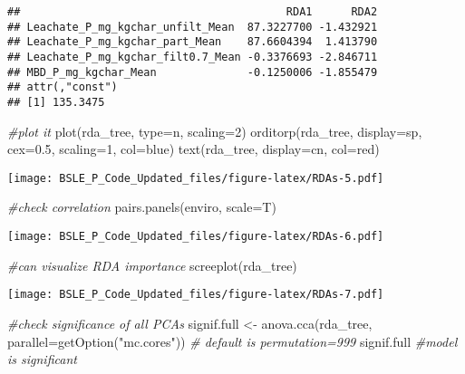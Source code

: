 \documentclass[
]{article}
\newenvironment{Shaded}{\begin{snugshade}}{\end{snugshade}}
\newcommand{\AttributeTok}[1]{\textcolor[rgb]{0.77,0.63,0.00}{#1}}
\newcommand{\CommentTok}[1]{\textcolor[rgb]{0.56,0.35,0.01}{\textit{#1}}}
\newcommand{\DecValTok}[1]{\textcolor[rgb]{0.00,0.00,0.81}{#1}}
\newcommand{\FloatTok}[1]{\textcolor[rgb]{0.00,0.00,0.81}{#1}}
\newcommand{\FunctionTok}[1]{\textcolor[rgb]{0.00,0.00,0.00}{#1}}
\newcommand{\NormalTok}[1]{#1}
\newcommand{\OtherTok}[1]{\textcolor[rgb]{0.56,0.35,0.01}{#1}}
\newcommand{\StringTok}[1]{\textcolor[rgb]{0.31,0.60,0.02}{#1}}
\begin{document}
\begin{verbatim}
##                                         RDA1      RDA2
## Leachate_P_mg_kgchar_unfilt_Mean  87.3227700 -1.432921
## Leachate_P_mg_kgchar_part_Mean    87.6604394  1.413790
## Leachate_P_mg_kgchar_filt0.7_Mean -0.3376693 -2.846711
## MBD_P_mg_kgchar_Mean              -0.1250006 -1.855479
## attr(,"const")
## [1] 135.3475
\end{verbatim}

\begin{Shaded}
\begin{Highlighting}[]
\CommentTok{\#plot it}
\FunctionTok{plot}\NormalTok{(rda\_tree, }\AttributeTok{type=}\StringTok{\textquotesingle{}n\textquotesingle{}}\NormalTok{, }\AttributeTok{scaling=}\DecValTok{2}\NormalTok{)}
\FunctionTok{orditorp}\NormalTok{(rda\_tree, }\AttributeTok{display=}\StringTok{\textquotesingle{}sp\textquotesingle{}}\NormalTok{, }\AttributeTok{cex=}\FloatTok{0.5}\NormalTok{, }\AttributeTok{scaling=}\DecValTok{1}\NormalTok{, }\AttributeTok{col=}\StringTok{\textquotesingle{}blue\textquotesingle{}}\NormalTok{)}
\FunctionTok{text}\NormalTok{(rda\_tree, }\AttributeTok{display=}\StringTok{\textquotesingle{}cn\textquotesingle{}}\NormalTok{, }\AttributeTok{col=}\StringTok{\textquotesingle{}red\textquotesingle{}}\NormalTok{)}
\end{Highlighting}
\end{Shaded}

\texttt{[image: BSLE\_P\_Code\_Updated\_files/figure-latex/RDAs-5.pdf]}

\begin{Shaded}
\begin{Highlighting}[]
\CommentTok{\#check correlation}
\FunctionTok{pairs.panels}\NormalTok{(enviro, }\AttributeTok{scale=}\NormalTok{T)}
\end{Highlighting}
\end{Shaded}

\texttt{[image: BSLE\_P\_Code\_Updated\_files/figure-latex/RDAs-6.pdf]}

\begin{Shaded}
\begin{Highlighting}[]
\CommentTok{\#can visualize RDA importance}
\FunctionTok{screeplot}\NormalTok{(rda\_tree)}
\end{Highlighting}
\end{Shaded}

\texttt{[image: BSLE\_P\_Code\_Updated\_files/figure-latex/RDAs-7.pdf]}

\begin{Shaded}
\begin{Highlighting}[]
\CommentTok{\#check significance of all PCAs}
\NormalTok{signif.full }\OtherTok{\textless{}{-}} \FunctionTok{anova.cca}\NormalTok{(rda\_tree, }\AttributeTok{parallel=}\FunctionTok{getOption}\NormalTok{(}\StringTok{"mc.cores"}\NormalTok{)) }\CommentTok{\# default is permutation=999}
\NormalTok{signif.full }\CommentTok{\#model is significant}
\end{Highlighting}
\end{Shaded}
\end{document}
